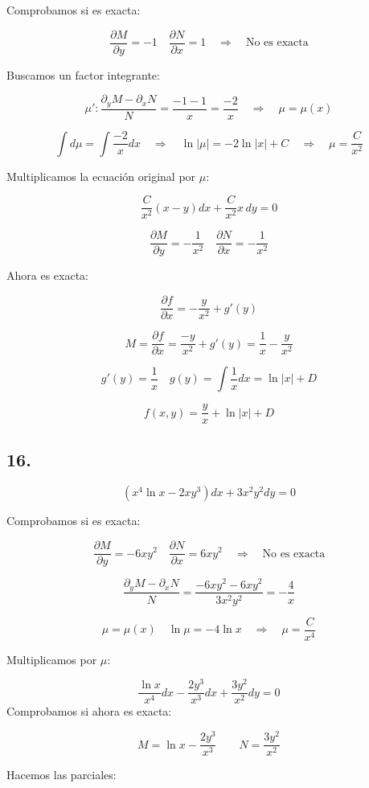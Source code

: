 \documentclass[a4paper,12pt]{article}
\begin{document}
Comprobamos si es exacta:

\[
\frac{\partial M}{\partial y} = -1 \quad \frac{\partial N}{\partial x} = 1 \quad \Rightarrow \quad \text{No es exacta}
\]

Buscamos un factor integrante:

\[
\mu': \frac{\partial_y M - \partial_x N}{N} = \frac{-1 - 1}{x} = \frac{-2}{x} \quad \Rightarrow \quad \mu = \mu(x)
\]

\[
\int d\mu = \int \frac{-2}{x} dx \quad \Rightarrow \quad \ln|\mu| = -2 \ln|x| + C \quad \Rightarrow \quad \mu = \frac{C}{x^2}
\]

Multiplicamos la ecuación original por $\mu$:

\[
\frac{C}{x^2}(x - y) dx + \frac{C}{x^2} x\, dy = 0
\]

\[
\frac{\partial M}{\partial y} = -\frac{1}{x^2} \quad \frac{\partial N}{\partial x} = -\frac{1}{x^2}
\]

Ahora es exacta:

\[
\frac{\partial f}{\partial x} = -\frac{y}{x^2} + g'(y)
\]

\[
M = \frac{\partial f}{\partial x} = \frac{-y}{x^2} + g'(y) = \frac{1}{x} - \frac{y}{x^2}
\]

\[
g'(y) = \frac{1}{x} \quad g(y) = \int \frac{1}{x} dx = \ln|x| + D
\]

\[
f(x,y) = \frac{y}{x} + \ln|x| + D
\]


\subsection*{16.}
\[
(x^4 \ln x - 2x y^3) dx + 3x^2 y^2 dy = 0
\]

Comprobamos si es exacta:

\[
\frac{\partial M}{\partial y} = -6xy^2 \quad \frac{\partial N}{\partial x} = 6xy^2 \quad \Rightarrow \quad \text{No es exacta}
\]

\[
\frac{\partial_y M - \partial_x N}{N} = \frac{-6xy^2 - 6xy^2}{3x^2 y^2} = -\frac{4}{x}
\]

\[
\mu = \mu(x) \quad \ln \mu = -4 \ln x \quad \Rightarrow \quad \mu = \frac{C}{x^4}
\]

Multiplicamos por $\mu$:

\[
\frac{\ln x}{x^4} dx - \frac{2y^3}{x^3} dx + \frac{3y^2}{x^2} dy = 0
\]
Comprobamos si ahora es exacta:

\[
M = \ln x - \frac{2y^3}{x^3} 
\quad\quad 
N = \frac{3y^2}{x^2}
\]

Hacemos las parciales:
\end{document}
